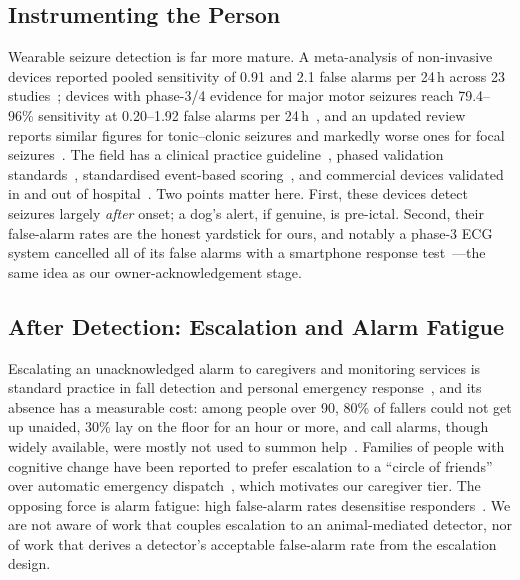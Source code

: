 \subsection{Instrumenting the Person}
Wearable seizure detection is far more mature. A meta-analysis of non-invasive devices reported pooled sensitivity of 0.91 and 2.1 false alarms per 24\,h across 23 studies~\cite{naganur2022meta}; devices with phase-3/4 evidence for major motor seizures reach 79.4--96\% sensitivity at 0.20--1.92 false alarms per 24\,h~\cite{meritamlarsen2023nonEEG}, and an updated review reports similar figures for tonic--clonic seizures and markedly worse ones for focal seizures~\cite{mohamed2026updated}. The field has a clinical practice guideline~\cite{beniczky2021ilae}, phased validation standards~\cite{beniczky2018standards}, standardised event-based scoring~\cite{dan2025szcore,shah2021metrics}, and commercial devices validated in and out of hospital~\cite{regalia2019empatica,arends2018nightwatch,jeppesen2025ecg}. Two points matter here. First, these devices detect seizures largely \emph{after} onset; a dog's alert, if genuine, is pre-ictal. Second, their false-alarm rates are the honest yardstick for ours, and notably a phase-3 ECG system cancelled all of its false alarms with a smartphone response test~\cite{jeppesen2025ecg}---the same idea as our owner-acknowledgement stage.

\subsection{After Detection: Escalation and Alarm Fatigue}
Escalating an unacknowledged alarm to caregivers and monitoring services is standard practice in fall detection and personal emergency response~\cite{igual2013fall,mubashir2013fall,karar2022fall}, and its absence has a measurable cost: among people over 90, 80\% of fallers could not get up unaided, 30\% lay on the floor for an hour or more, and call alarms, though widely available, were mostly not used to summon help~\cite{fleming2008floor}. Families of people with cognitive change have been reported to prefer escalation to a ``circle of friends'' over automatic emergency dispatch~\cite{ferguson2025ambient}, which motivates our caregiver tier. The opposing force is alarm fatigue: high false-alarm rates desensitise responders~\cite{cvach2012alarm,sendelbach2013alarm,ahrq2020alarm}. We are not aware of work that couples escalation to an animal-mediated detector, nor of work that derives a detector's acceptable false-alarm rate from the escalation design.

